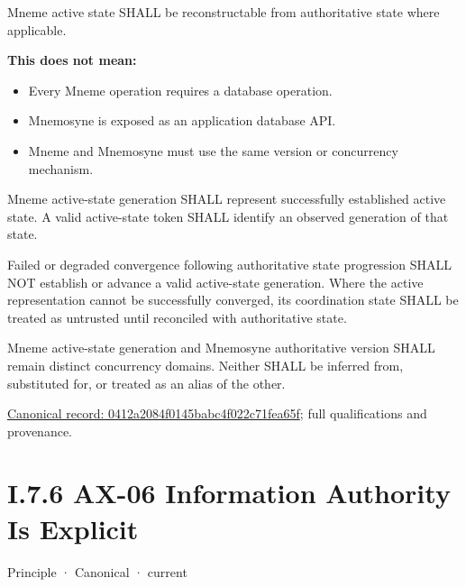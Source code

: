 Mneme active state SHALL be reconstructable from authoritative state
where applicable.



\textbf{This does not mean:}



\begin{itemize}


\item Every Mneme operation requires a database operation.

\item Mnemosyne is exposed as an application database API.

\item Mneme and Mnemosyne must use the same version or concurrency mechanism.

\end{itemize}


Mneme active-state generation SHALL represent successfully established active state. A valid active-state token SHALL identify an observed generation of that state.



Failed or degraded convergence following authoritative state progression SHALL NOT establish or advance a valid active-state generation. Where the active representation cannot be successfully converged, its coordination state SHALL be treated as untrusted until reconciled with authoritative state.



Mneme active-state generation and Mnemosyne authoritative version SHALL remain distinct concurrency domains. Neither SHALL be inferred from, substituted for, or treated as an alias of the other.


{\footnotesize \href{../../../../continuum/motivation/principle/0412a2084f0145babc4f022c71fea65f.md}{Canonical record: 0412a2084f0145babc4f022c71fea65f}; full qualifications and provenance.}\par
\section*{I.7.6 AX-06 Information Authority Is Explicit}
\label{navigation:I.7.6}

\label{element:952c3b6148ce4fce94b69f99a0c2fec7}
{\small Principle · Canonical · current}\par

